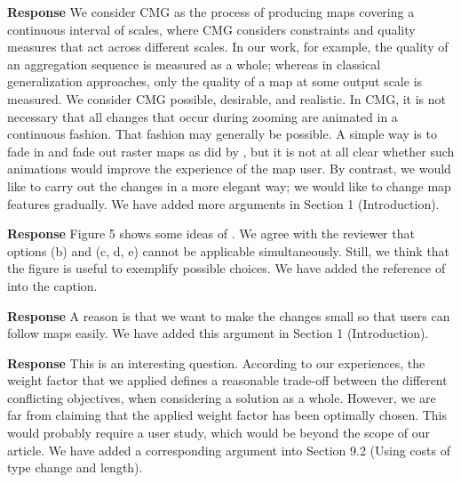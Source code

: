 \documentclass[a4paper,twoside,11pt]{reviewresponse}
\begin{document}

\textbf{Response} 
We consider CMG as the process of producing maps 
covering a continuous interval of scales,
where CMG considers constraints and quality measures 
that act across different scales. 
In our work, for example, the quality of an aggregation sequence 
is measured as a whole; 
whereas in classical generalization approaches, 
only the quality of a map at some output scale is measured.
We consider CMG possible, desirable, and realistic.
In CMG, it is not necessary that 
all changes that occur during zooming are animated in a continuous fashion. 
That fashion may generally be possible. 
A simple way is to fade in and fade out raster maps
as did by \textcite{Pantazis2009b}, 
but it is not at all clear 
whether such animations would improve the experience of the map user.
By contrast, we would like to carry out the changes in a more elegant way;
we would like to change map features gradually.
We have added more arguments in Section 1 (Introduction).



\textbf{Response} Figure 5 shows some ideas of \textcite{Cheng2006}.
We agree with the reviewer that
options (b) and (c, d, e) cannot be applicable simultaneously.
Still, we think that the figure is useful to exemplify possible choices.
We have added the reference of \textcite{Cheng2006} into the caption.



\textbf{Response}
A reason is that we want to make the changes small 
so that users can follow maps easily.
We have added this argument in Section 1 (Introduction).


\textbf{Response} 
This is an interesting question.
According to our experiences, 
the weight factor that we applied defines a reasonable trade-off 
between the different conflicting objectives, 
when considering a solution as a whole. 
However, we are far from claiming that 
the applied weight factor has been optimally chosen. 
This would probably require a user study, 
which would be beyond the scope of our article.
We have added a corresponding argument into Section 9.2
(Using costs of type change and length).
\end{document}
